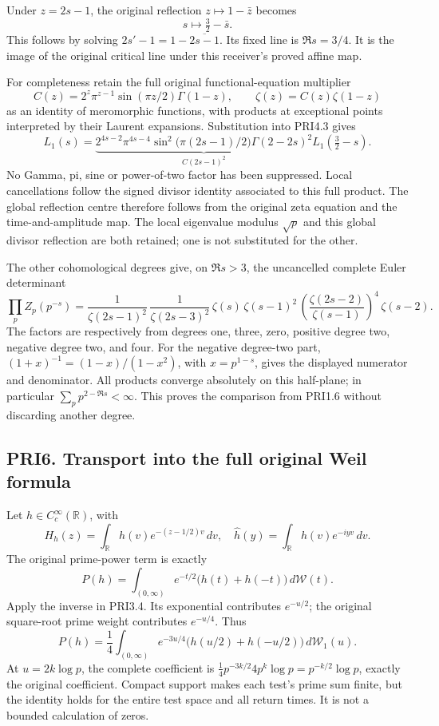 \documentclass[
]{article}
\begin{document}
Under \(z=2s-1\), the original reflection \(z\mapsto1-\bar z\) becomes
\[
s\longmapsto\tfrac32-\bar s.
\tag{PRI5.1}
\] This follows by solving \(2s'-1=1-\overline{2s-1}\). Its fixed line
is \(\Re s=3/4\). It is the image of the original critical line under
this receiver's proved affine map.

For completeness retain the full original functional-equation multiplier
\[
C(z)=2^z\pi^{z-1}\sin(\pi z/2)\Gamma(1-z),\qquad
\zeta(z)=C(z)\zeta(1-z)
\tag{PRI5.2}
\] as an identity of meromorphic functions, with products at exceptional
points interpreted by their Laurent expansions. Substitution into PRI4.3
gives \[
L_1(s)=
\underbrace{2^{4s-2}\pi^{4s-4}
\sin^2\!\bigl(\pi(2s-1)/2\bigr)\Gamma(2-2s)^2}_{C(2s-1)^2}
L_1(\tfrac32-s).
\tag{PRI5.3}
\] No Gamma, pi, sine or power-of-two factor has been suppressed. Local
cancellations follow the signed divisor identity associated to this full
product. The global reflection centre therefore follows from the
original zeta equation and the time-and-amplitude map. The local
eigenvalue modulus \(\sqrt p\) and this global divisor reflection are
both retained; one is not substituted for the other.

The other cohomological degrees give, on \(\Re s>3\), the uncancelled
complete Euler determinant \[
\prod_p Z_p(p^{-s})=
\frac1{\zeta(2s-1)^2}\,
\frac1{\zeta(2s-3)^2}\,
\zeta(s)\,
\zeta(s-1)^2\,
\left(\frac{\zeta(2s-2)}{\zeta(s-1)}\right)^4\,
\zeta(s-2).
\tag{PRI5.4}
\] The factors are respectively from degrees one, three, zero, positive
degree two, negative degree two, and four. For the negative degree-two
part, \((1+x)^{-1}=(1-x)/(1-x^2)\), with \(x=p^{1-s}\), gives the
displayed numerator and denominator. All products converge absolutely on
this half-plane; in particular \(\sum_p p^{2-\Re s}<\infty\). This
proves the comparison from PRI1.6 without discarding another degree.

\subsection{PRI6. Transport into the full original Weil
formula}\label{pri6.-transport-into-the-full-original-weil-formula}

Let \(h\in C_c^\infty(\mathbb R)\), with \[
H_h(z)=\int_{\mathbb R}h(v)e^{-(z-1/2)v}\,dv,
\quad\widehat h(y)=\int_{\mathbb R}h(v)e^{-iyv}\,dv.
\tag{PRI6.1}
\] The original prime-power term is exactly \[
P(h)=\int_{(0,\infty)}e^{-t/2}\bigl(h(t)+h(-t)\bigr)\,d\mathcal W(t).
\] Apply the inverse in PRI3.4. Its exponential contributes
\(e^{-u/2}\); the original square-root prime weight contributes
\(e^{-u/4}\). Thus \[
\boxed{P(h)=\frac14\int_{(0,\infty)}e^{-3u/4}
\bigl(h(u/2)+h(-u/2)\bigr)\,d\mathcal W_1(u).}
\tag{PRI6.2}
\] At \(u=2k\log p\), the complete coefficient is
\(\tfrac14 p^{-3k/2}4p^k\log p=p^{-k/2}\log p\), exactly the original
coefficient. Compact support makes each test's prime sum finite, but the
identity holds for the entire test space and all return times. It is not
a bounded calculation of zeros.
\end{document}
